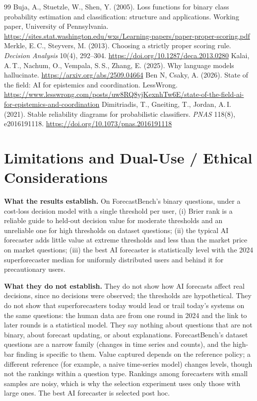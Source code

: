 \documentclass[10pt]{article}
\begin{document}
\begin{thebibliography}{99}
 Buja, A., Stuetzle, W., Shen, Y. (2005). Loss functions for binary class probability estimation and classification: structure and applications. Working paper, University of Pennsylvania. \url{https://sites.stat.washington.edu/wxs/Learning-papers/paper-proper-scoring.pdf}
 Merkle, E.\,C., Steyvers, M. (2013). Choosing a strictly proper scoring rule. \emph{Decision Analysis} 10(4), 292--304. \url{https://doi.org/10.1287/deca.2013.0280}
 Kalai, A.\,T., Nachum, O., Vempala, S.\,S., Zhang, E. (2025). Why language models hallucinate. \url{https://arxiv.org/abs/2509.04664}
 Ben N, Csaky, A. (2026). State of the field: AI for epistemics and coordination. LessWrong. \url{https://www.lesswrong.com/posts/uw8RQ8yjKexnhTw6E/state-of-the-field-ai-for-epistemics-and-coordination}
 Dimitriadis, T., Gneiting, T., Jordan, A.\,I. (2021). Stable reliability diagrams for probabilistic classifiers. \emph{PNAS} 118(8), e2016191118. \url{https://doi.org/10.1073/pnas.2016191118}
\end{thebibliography}

\appendix
\section{Limitations and Dual-Use / Ethical Considerations}\label{app:limits}
\textbf{What the results establish.} On ForecastBench's binary questions, under a cost-loss decision model with a single threshold per user, (i) Brier rank is a reliable guide to held-out decision value for moderate thresholds and an unreliable one for high thresholds on dataset questions; (ii) the typical AI forecaster adds little value at extreme thresholds and less than the market price on market questions; (iii) the best AI forecaster is statistically level with the 2024 superforecaster median for uniformly distributed users and behind it for precautionary users.

\textbf{What they do not establish.} They do not show how AI forecasts affect real decisions, since no decisions were observed; the thresholds are hypothetical. They do not show that superforecasters today would lead or trail today's systems on the same questions: the human data are from one round in 2024 and the link to later rounds is a statistical model. They say nothing about questions that are not binary, about forecast updating, or about explanations. ForecastBench's dataset questions are a narrow family (changes in time series and counts), and the high-bar finding is specific to them. Value captured depends on the reference policy; a different reference (for example, a naive time-series model) changes levels, though not the rankings within a question type. Rankings among forecasters with small samples are noisy, which is why the selection experiment uses only those with large ones. The best AI forecaster is selected post hoc.
\end{document}
